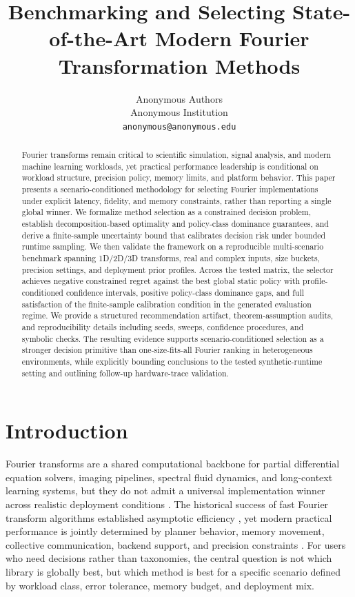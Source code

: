 \documentclass{article} %
\title{Benchmarking and Selecting State-of-the-Art Modern Fourier Transformation Methods}
\author{Anonymous Authors \\
Anonymous Institution \\
\texttt{anonymous@anonymous.edu}}
\begin{document}
\maketitle

\begin{abstract}
Fourier transforms remain critical to scientific simulation, signal analysis, and modern machine learning workloads, yet practical performance leadership is conditional on workload structure, precision policy, memory limits, and platform behavior. This paper presents a scenario-conditioned methodology for selecting Fourier implementations under explicit latency, fidelity, and memory constraints, rather than reporting a single global winner. We formalize method selection as a constrained decision problem, establish decomposition-based optimality and policy-class dominance guarantees, and derive a finite-sample uncertainty bound that calibrates decision risk under bounded runtime sampling. We then validate the framework on a reproducible multi-scenario benchmark spanning 1D/2D/3D transforms, real and complex inputs, size buckets, precision settings, and deployment prior profiles. Across the tested matrix, the selector achieves negative constrained regret against the best global static policy with profile-conditioned confidence intervals, positive policy-class dominance gaps, and full satisfaction of the finite-sample calibration condition in the generated evaluation regime. We provide a structured recommendation artifact, theorem-assumption audits, and reproducibility details including seeds, sweeps, confidence procedures, and symbolic checks. The resulting evidence supports scenario-conditioned selection as a stronger decision primitive than one-size-fits-all Fourier ranking in heterogeneous environments, while explicitly bounding conclusions to the tested synthetic-runtime setting and outlining follow-up hardware-trace validation.
\end{abstract}

\section{Introduction}
Fourier transforms are a shared computational backbone for partial differential equation solvers, imaging pipelines, spectral fluid dynamics, and long-context learning systems, but they do not admit a universal implementation winner across realistic deployment conditions \citep{S01,S03,S07,S09,S10,S15,S20,S42}. The historical success of fast Fourier transform algorithms established asymptotic efficiency \citep{S01,S22,S23}, yet modern practical performance is jointly determined by planner behavior, memory movement, collective communication, backend support, and precision constraints \citep{S02,S03,S08,S25,S26,S27,S28,S39,S41}. For users who need decisions rather than taxonomies, the central question is not which library is globally best, but which method is best for a specific scenario defined by workload class, error tolerance, memory budget, and deployment mix.
\end{document}
